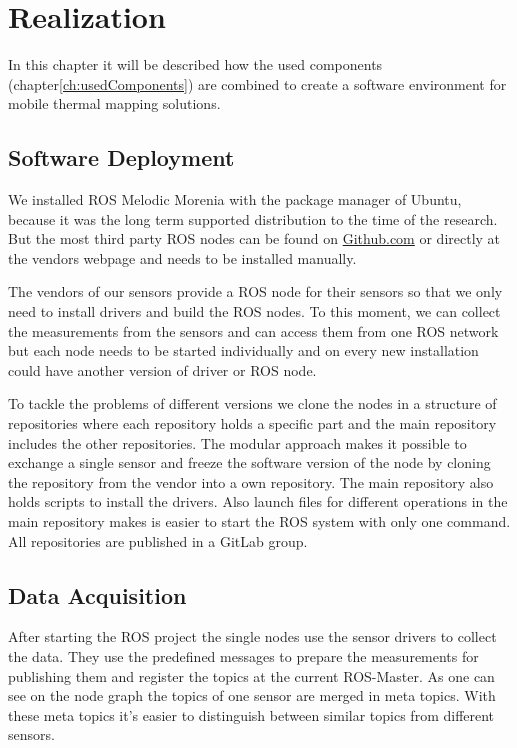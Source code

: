 \chapter{Realization}\label{ch:realization}

In this chapter it will be described how the used components (chapter\ref{ch:usedComponents}) are combined to create a software environment for mobile thermal mapping solutions.

\section{Software Deployment}\label{ch:realization:sec:softwareDeployment}

We installed \ac{ROS} Melodic Morenia with the package manager of Ubuntu, because it was the long term supported distribution to the time of the research.
But the most third party \ac{ROS} nodes can be found on \href{https://github.com}{Github.com} or directly at the vendors webpage and needs to be installed manually.

The vendors of our sensors provide a \ac{ROS} node for their sensors so that we only need to install drivers and build the \ac{ROS} nodes.
To this moment, we can collect the measurements from the sensors and can access them from one \ac{ROS} network but each node needs to be started individually and on every new installation could have another version of driver or \ac{ROS} node.

To tackle the problems of different versions we clone the nodes in a structure of repositories where each repository holds a specific part and the main repository includes the other repositories.
The modular approach makes it possible to exchange a single sensor and freeze the software version of the node by cloning the repository from the vendor into a own repository.
The main repository also holds scripts to install the drivers.
Also launch files for different operations in the main repository makes is easier to start the ROS system with only one command.
All repositories are published in a GitLab group\cite{GitlabGroup}.

\section{Data Acquisition}\label{ch:realization:sec:dataAcquisition}

After starting the \ac{ROS} project the single nodes use the sensor drivers to collect the data.
They use the predefined messages to prepare the measurements for publishing them and register the topics at the current ROS-Master.
As one can see on the node graph the topics of one sensor are merged in meta topics.
With these meta topics it's easier to distinguish between similar topics from different sensors.

